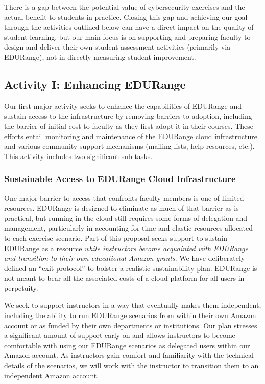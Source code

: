 There is a gap between the potential value of cybersecurity exercises
and the actual benefit to students in practice.  Closing this gap and
achieving our goal through the activities outlined below can have a
direct impact on the quality of student learning, but our main focus
is on supporting and preparing faculty to design and deliver their own
student assessment activities (primarily via EDURange), not in
directly measuring student improvement.


\subsection{Activity I: Enhancing EDURange}

Our first major activity seeks to enhance the capabilities of EDURange
and sustain access to the infrastructure by removing barriers to
adoption, including the barrier of initial cost to faculty as they
first adopt it in their courses.  These efforts entail monitoring and
maintenance of the EDURange cloud infrastructure and various community
support mechanisms (mailing lists, help resources, etc.).  This
activity includes two significant sub-tasks.

\subsubsection{Sustainable Access to EDURange Cloud Infrastructure}

One major barrier to access that confronts faculty members is one of
limited resources.  EDURange is designed to eliminate as much of that
barrier as is practical, but running in the cloud still requires some
forms of delegation and management, particularly in accounting for
time and elastic resources allocated to each exercise scenario.  Part
of this proposal seeks support to sustain EDURange as a resource {\em
  while instructors become acquainted with EDURange and transition to
  their own educational Amazon grants}.  We have deliberately defined
an ``exit protocol'' to bolster a realistic sustainability plan.
EDURange is not meant to bear all the associated costs of a cloud
platform for all users in perpetuity.

 \hskip 0.1in We seek to support
instructors in a way that eventually makes them independent, including
the ability to run EDURange scenarios from within their own Amazon
account or as funded by their own departments or institutions.  Our
plan stresses a significant amount of support early on and allows
instructors to become comfortable with using our EDURange scenarios as
delegated users within our Amazon account.  As instructors gain
comfort and familiarity with the technical details of the scenarios,
we will work with the instructor to transition them to an independent
Amazon account.

